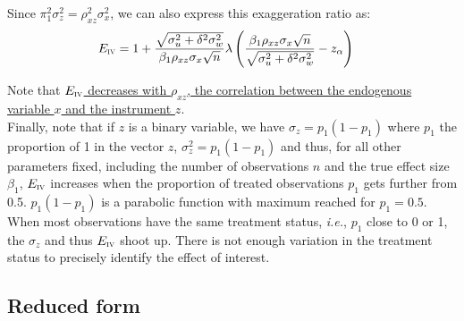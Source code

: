 \documentclass[a4paper, 11pt]{report}
\begin{document}
				
				Since $\pi_{1}^{2}\sigma_{z}^{2} = \rho_{xz}^{2}\sigma_{x}^{2}$, we can also express this exaggeration ratio as:
				~
				\begin{align*}
					E_{\textsc{iv}} & = 
					1 + 
					\dfrac{\sqrt{\sigma_{u}^{2} +  \delta^{2} \sigma_{w}^{2}}}{\beta_{1}\rho_{xz} \sigma_{x}\sqrt{n}}
					 \lambda \left( \dfrac{\beta_{1}\rho_{xz} \sigma_{x}\sqrt{n}}{\sqrt{\sigma_{u}^{2} +  \delta^{2} \sigma_{w}^{2} }} - z_{\alpha} \right)
				\end{align*}
				
				Note that \ul{$E_{\textsc{iv}}$ decreases with $\rho_{xz}$, the correlation between the endogenous variable $x$ and the instrument $z$}.	\\
				
			Finally, note that if $z$ is a binary variable, we have $\sigma_z = p_{1}(1-p_{1})$ where $p_{1}$ the proportion of 1 in the vector $z$, $\sigma_{z}^{2} = p_{1}(1 - p_{1})$ and thus, for all other parameters fixed, including the number of observations $n$ and the true effect size $\beta_{1}$, $E_{\textsc{iv}}$ increases when the proportion of treated observations $p_{1}$ gets further from 0.5.  $p_{1} (1-p_{1})$ is a parabolic function with maximum reached for $p_{1} = 0.5$. When most observations have the same treatment status, \textit{i.e.}, $p_{1}$ close to 0 or 1, the $\sigma_z$ and thus $E_{\textsc{iv}}$ shoot up. There is not enough variation in the treatment status to precisely identify the effect of interest. 

				 
		\subsection{Reduced form}
		
\end{document}
